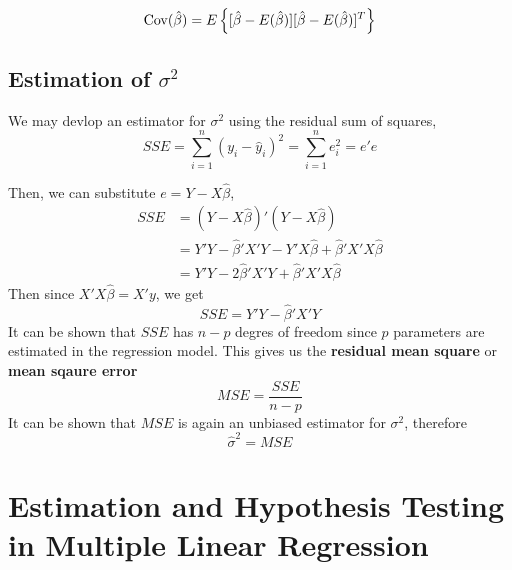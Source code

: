 \[\operatorname{Cov}(\hat{\beta}) = E\left\{[\hat{\beta} - E(\hat{\beta})][\hat{\beta} - E(\hat{\beta})]^T\right\}\]

\subsection{Estimation of $\sigma^2$}

We may devlop an estimator for $\sigma^2$ using the residual sum of squares, 
\[SSE = \sum_{i=1}^n (y_i - \hat{y}_i)^2 = \sum_{i=1}^n e_i^2 =e'e\]

Then, we can substitute $e = Y - X\hat{\beta}$, 
\begin{align*}
    SSE &= (Y - X\hat{\beta})'(Y - X\hat{\beta})\\
        &= Y'Y - \hat{\beta}'X'Y - Y'X\hat{\beta} + \hat{\beta}'X'X\hat{\beta}\\
        &= Y'Y - 2\hat{\beta}'X'Y + \hat{\beta}'X'X\hat{\beta}
\end{align*}
Then since $X'X\hat{\beta} = X'y$, we get
\[SSE = Y'Y - \hat{\beta}'X'Y\]
It can be shown that $SSE$ has $n-p$ degres of freedom since $p$ parameters are estimated in the regression model. This gives us the \textbf{residual mean square} or \textbf{mean sqaure error}
\[MSE = \frac{SSE}{n-p}\]
It can be shown that $MSE$ is again an unbiased estimator for $\sigma^2$, therefore 
\[\hat{\sigma}^2 = MSE\]
\section{Estimation and Hypothesis Testing in Multiple Linear Regression}

